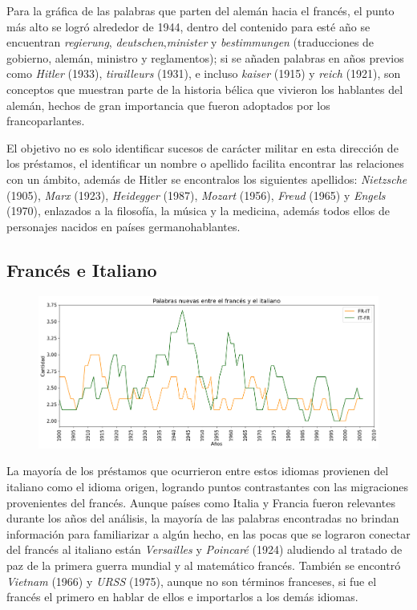 Para la gráfica de las palabras que parten del alemán hacia el francés, el punto más alto se logró alrededor de 1944,  dentro del contenido para esté año se encuentran  \textit{regierung},  \textit{deutschen},\textit{minister} y  \textit{bestimmungen} (traducciones de gobierno, alemán, ministro y reglamentos);   si se añaden palabras en años previos como \textit{Hitler} (1933),  \textit{tirailleurs} (1931),  e incluso \textit{kaiser} (1915) y \textit{reich} (1921), son conceptos que muestran parte de la historia bélica que vivieron los hablantes del alemán, hechos de gran importancia que fueron adoptados por los francoparlantes. 

El objetivo no es solo identificar sucesos de carácter militar en esta dirección de los préstamos, el identificar un nombre o apellido facilita encontrar las relaciones con un ámbito,  además de Hitler se encontralos los siguientes apellidos:  \textit{Nietzsche} (1905),  \textit{Marx} (1923), \textit{Heidegger} (1987),  \textit{Mozart} (1956), \textit{Freud} (1965) y \textit{Engels} (1970), enlazados a la filosofía, la música y la medicina,  además todos ellos de personajes nacidos en países germanohablantes.


\newpage

\subsection{Francés e Italiano}

\begin{figure}[h!]
	\centering
	\includegraphics[scale=.38]{Cap_2/NC_3_S2_FR.png}
	\label{NC_FI}
	\caption{}
\end{figure}

La mayoría de los préstamos que ocurrieron entre estos idiomas provienen del italiano como el idioma origen, logrando puntos contrastantes con las migraciones provenientes del francés. Aunque países como Italia y Francia  fueron relevantes durante los años del análisis,  la mayoría de las palabras encontradas no brindan información para familiarizar a algún hecho,  en las pocas que se lograron conectar del francés al italiano están \textit{Versailles} y \textit{Poincaré} (1924) aludiendo al tratado de paz de la primera guerra mundial y al matemático francés.  También se encontró  \textit{Vietnam} (1966) y \textit{URSS} (1975), aunque no son términos franceses, si fue el francés el primero en hablar de ellos e importarlos a los demás idiomas.

